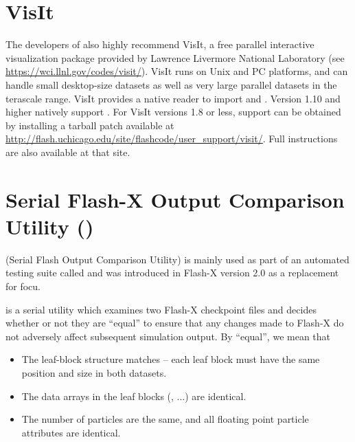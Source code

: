 

\chapter{VisIt}
\label{Sec:visit}
The developers of  also highly recommend VisIt, a free parallel interactive
visualization
package provided by Lawrence Livermore National Laboratory 
(see \url{https://wci.llnl.gov/codes/visit/}).
VisIt runs on Unix and PC platforms, and can handle small desktop-size datasets
as well as very large parallel datasets in the terascale range.  VisIt
provides a native reader to import  and \flashx.
Version 1.10 and higher natively
support \flashx.
For VisIt versions 1.8 or less, \flashx support can be obtained by installing
a tarball patch available at 
\url{http://flash.uchicago.edu/site/flashcode/user_support/visit/}.
Full instructions are also available at that site.


\chapter{Serial Flash-X Output Comparison Utility ()}
\label{Chp:sfocu}

 (Serial Flash Output Comparison Utility) is mainly used as part of
an automated testing suite called  and was introduced in Flash-X
version 2.0 as a replacement for focu.

 is a serial utility which examines two Flash-X checkpoint files and
decides whether or not they are ``equal'' to ensure that any changes made to Flash-X do
not adversely affect subsequent simulation output.  By ``equal'', we mean
that

\begin{itemize} \item The leaf-block structure matches -- each leaf block
must have the same position and size in both datasets.

\item The data arrays in the leaf blocks (, ...) are
identical.

\item The number of particles are the same, and all floating point particle
attributes are identical.
\end{itemize}

